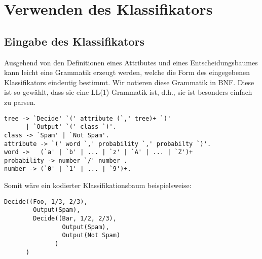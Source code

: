 \documentclass{article}
\begin{document}
\pagebreak  %
\section{Verwenden des Klassifikators}
\subsection{Eingabe des Klassifikators}
Ausgehend von den Definitionen eines Attributes und eines Entscheidungsbaumes
kann leicht eine Grammatik erzeugt werden, welche die Form des eingegebenen
Klassifikators eindeutig bestimmt. Wir notieren diese Grammatik in BNF. Diese
ist so gew\"ahlt, dass sie eine LL(1)-Grammatik ist, d.h., sie ist besonders
einfach zu parsen.\\
\begin{verbatim}
tree -> `Decide' `(' attribute (`,' tree)+ `)'
      | `Output' `(' class `)'.
class -> `Spam' | `Not Spam'.
attribute -> `(' word `,' probability `,' probabilty `)'.
word ->   (`a' | `b' | ... | `z' | `A' | ... | `Z')+
probability -> number `/' number .
number -> (`0' | `1' | ... | `9')+.
\end{verbatim}

Somit w\"are ein kodierter Klassifikationsbaum beispielsweise:
\begin{verbatim}
Decide((Foo, 1/3, 2/3),
        Output(Spam), 
        Decide((Bar, 1/2, 2/3), 
                Output(Spam), 
                Output(Not Spam)
              )
      )
\end{verbatim}
\end{document}
